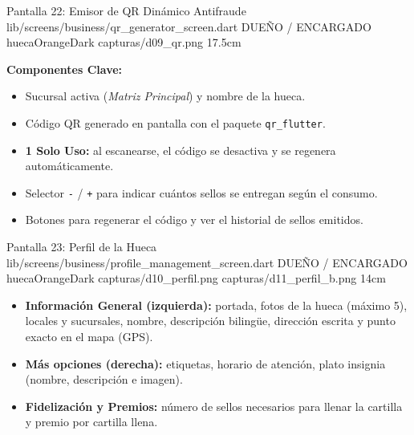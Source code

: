 \pantallashowcase
  {Pantalla 22: Emisor de QR Dinámico Antifraude}
  {lib/screens/business/qr_generator_screen.dart}
  {DUEÑO / ENCARGADO}
  {huecaOrangeDark}
  {capturas/d09_qr.png}
  {17.5cm}
  {

    \textbf{Componentes Clave:}
    \begin{itemize}[leftmargin=*, itemsep=2pt]
      \item Sucursal activa (\textit{Matriz Principal}) y nombre de la hueca.
      \item Código QR generado en pantalla con el paquete \texttt{qr\_flutter}.
      \item \textbf{1 Solo Uso:} al escanearse, el código se desactiva y se regenera automáticamente.
      \item Selector \texttt{-} / \texttt{+} para indicar cuántos sellos se entregan según el consumo.
      \item Botones para regenerar el código y ver el historial de sellos emitidos.
    \end{itemize}
  }

\pantalladoble
  {Pantalla 23: Perfil de la Hueca}
  {lib/screens/business/profile_management_screen.dart}
  {DUEÑO / ENCARGADO}
  {huecaOrangeDark}
  {capturas/d10_perfil.png}
  {capturas/d11_perfil_b.png}
  {14cm}
  {
    \begin{itemize}[leftmargin=*, itemsep=2pt]
      \item \textbf{Información General (izquierda):} portada, fotos de la hueca (máximo 5), locales y sucursales, nombre, descripción bilingüe, dirección escrita y punto exacto en el mapa (GPS).
      \item \textbf{Más opciones (derecha):} etiquetas, horario de atención, plato insignia (nombre, descripción e imagen).
      \item \textbf{Fidelización y Premios:} número de sellos necesarios para llenar la cartilla y premio por cartilla llena.
    \end{itemize}
  }

